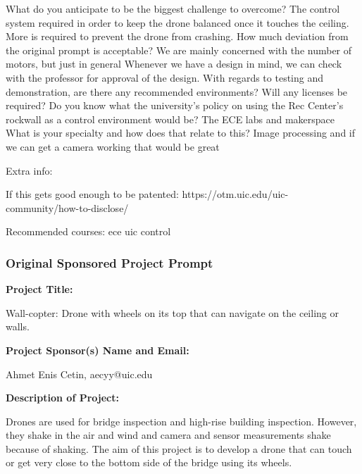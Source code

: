 \documentclass[12pt]{article}
\begin{document}
                {What do you anticipate to be the biggest challenge to overcome?}
                {The control system required in order to keep the drone balanced once it touches the ceiling. More is required to prevent the drone from crashing.}
                \qna
                {How much deviation from the original prompt is acceptable? We are mainly concerned with the number of motors, but just in general}
                {Whenever we have a design in mind, we can check with the professor for approval of the design.}
                \qna
                {With regards to testing and demonstration, are there any recommended environments? Will any licenses be required? Do you know what the university's policy on using the Rec Center's rockwall as a control environment would be?}
                {The ECE labs and makerspace}
                \qna
                {What is your specialty and how does that relate to this?}
                {Image processing and if we can get a camera working that would be great}

                \noindent Extra info:

                If this gets good enough to be patented: https://otm.uic.edu/uic-community/how-to-disclose/

                Recommended courses: ece uic control
            
            \subsubsection{Original Sponsored Project Prompt}

                \noindent\textbf{\large Project Title:}

                Wall-copter: Drone with wheels on its top that can navigate on the ceiling or walls.

                \noindent\textbf{\large Project Sponsor(s) Name and Email:}

                Ahmet Enis Cetin, aecyy@uic.edu

                \noindent\textbf{\large Description of Project:}

                Drones are used for bridge inspection and high-rise building inspection.
                However, they shake in the air and wind and camera and sensor measurements shake because of shaking.
                The aim of this project is to develop a drone that can touch or get very close to the bottom side of the bridge using its wheels.
\end{document}
